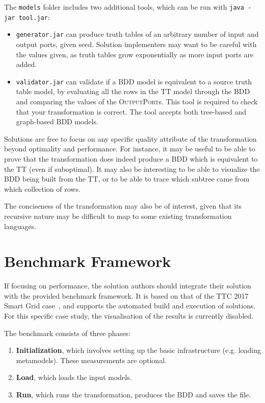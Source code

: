 \documentclass[a4paper]{scrartcl}
\newcommand*{\class}[1]{\textsc{#1}}
\newcommand*{\file}[1]{\texttt{#1}}
\begin{document}
The \file{models} folder includes two additional tools, which can be run with
\file{java -jar tool.jar}:
\begin{itemize}
\item \file{generator.jar} can produce truth tables of an arbitrary number of
  input and output ports, given seed. Solution implementers may want to be
  careful with the values given, as truth tables grow exponentially as more
  input ports are added.

\item \file{validator.jar} can validate if a BDD model is equivalent to a source
  truth table model, by evaluating all the rows in the TT model through the BDD
  and comparing the values of the \class{Output\-Port}s. This tool is required
  to check that your transformation is correct. The tool accepts both tree-based
  and graph-based BDD models.
\end{itemize}

Solutions are free to focus on any specific quality attribute of the
transformation beyond optimality and performance. For instance, it may be useful
to be able to prove that the transformation does indeed produce a BDD which is
equivalent to the TT (even if suboptimal). It may also be interesting to be able
to visualize the BDD being built from the TT, or to be able to trace which
subtree came from which collection of rows.

The conciseness of the transformation may also be of interest, given that its
recursive nature may be difficult to map to some existing transformation
languages.

\section{Benchmark Framework}
\label{sec:benchmark-framework}

If focusing on performance, the solution authors should integrate their solution
with the provided benchmark framework. It is based on that of the TTC 2017 Smart
Grid case~\cite{hinkel_ttc_2017}, and supports the automated build and execution
of solutions. For this specific case study, the visualisation of the results is
currently disabled.

The benchmark consists of three phases:

\begin{enumerate}
\item \textbf{Initialization}, which involves setting up the basic
  infrastructure (e.g. loading metamodels). These measurements are optional.
\item \textbf{Load}, which loads the input models.
\item \textbf{Run}, which runs the transformation, produces the BDD and saves
  the file.
\end{enumerate}
\end{document}

